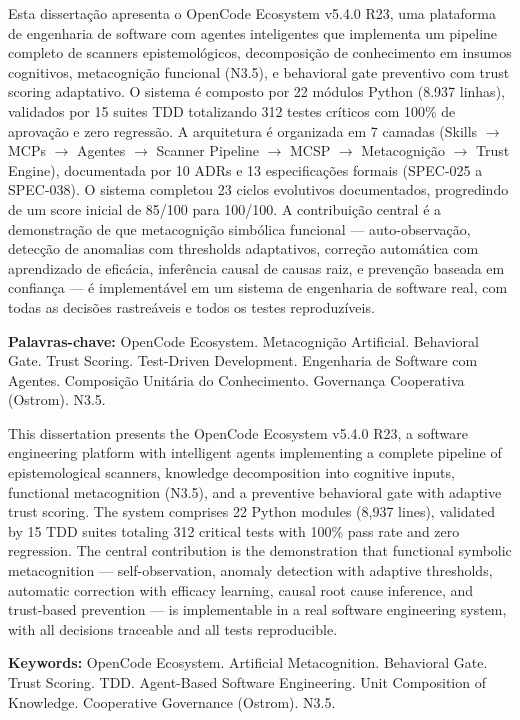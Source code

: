 \begin{resumo}
Esta dissertação apresenta o OpenCode Ecosystem v5.4.0 R23, uma plataforma de engenharia de software com agentes inteligentes que implementa um pipeline completo de scanners epistemológicos, decomposição de conhecimento em insumos cognitivos, metacognição funcional (N3.5), e behavioral gate preventivo com trust scoring adaptativo. O sistema é composto por 22 módulos Python (8.937 linhas), validados por 15 suites TDD totalizando 312 testes críticos com 100\% de aprovação e zero regressão. A arquitetura é organizada em 7 camadas (Skills $\rightarrow$ MCPs $\rightarrow$ Agentes $\rightarrow$ Scanner Pipeline $\rightarrow$ MCSP $\rightarrow$ Metacognição $\rightarrow$ Trust Engine), documentada por 10 ADRs e 13 especificações formais (SPEC-025 a SPEC-038). O sistema completou 23 ciclos evolutivos documentados, progredindo de um score inicial de 85/100 para 100/100. A contribuição central é a demonstração de que metacognição simbólica funcional — auto-observação, detecção de anomalias com thresholds adaptativos, correção automática com aprendizado de eficácia, inferência causal de causas raiz, e prevenção baseada em confiança — é implementável em um sistema de engenharia de software real, com todas as decisões rastreáveis e todos os testes reproduzíveis.

\textbf{Palavras-chave:} OpenCode Ecosystem. Metacognição Artificial. Behavioral Gate. Trust Scoring. Test-Driven Development. Engenharia de Software com Agentes. Composição Unitária do Conhecimento. Governança Cooperativa (Ostrom). N3.5.
\end{resumo}

\begin{resumo}[Abstract]
This dissertation presents the OpenCode Ecosystem v5.4.0 R23, a software engineering platform with intelligent agents implementing a complete pipeline of epistemological scanners, knowledge decomposition into cognitive inputs, functional metacognition (N3.5), and a preventive behavioral gate with adaptive trust scoring. The system comprises 22 Python modules (8,937 lines), validated by 15 TDD suites totaling 312 critical tests with 100\% pass rate and zero regression. The central contribution is the demonstration that functional symbolic metacognition — self-observation, anomaly detection with adaptive thresholds, automatic correction with efficacy learning, causal root cause inference, and trust-based prevention — is implementable in a real software engineering system, with all decisions traceable and all tests reproducible.

\textbf{Keywords:} OpenCode Ecosystem. Artificial Metacognition. Behavioral Gate. Trust Scoring. TDD. Agent-Based Software Engineering. Unit Composition of Knowledge. Cooperative Governance (Ostrom). N3.5.
\end{resumo}

\listoffigures*
\cleardoublepage
{}
\listoftables*
\cleardoublepage
{}
\tableofcontents*
\cleardoublepage
